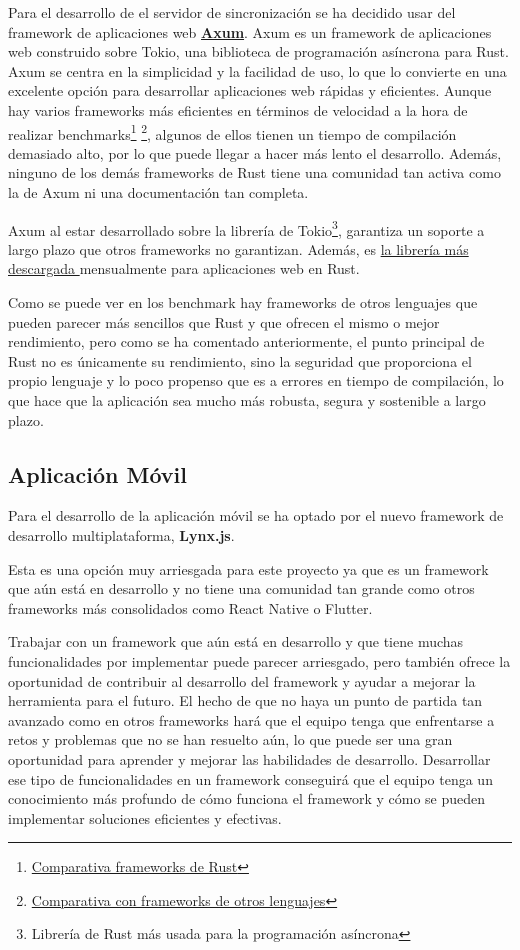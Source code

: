 Para el desarrollo de el servidor de sincronización se ha decidido usar del framework de aplicaciones web \href{https://github.com/tokio-rs/axum?tab=readme-ov-file}{\textbf{Axum}}.
Axum es un framework de aplicaciones web construido sobre Tokio, una biblioteca de programación asíncrona para Rust. Axum se centra en la simplicidad y la facilidad de uso, lo que lo convierte en una excelente opción para desarrollar aplicaciones web rápidas y eficientes.
Aunque hay varios frameworks más eficientes en términos de velocidad a la hora de realizar benchmarks\footnote{\href{https://web-frameworks-benchmark.netlify.app/result?l=rust}{Comparativa frameworks de Rust}} \footnote{\href{https://www.techempower.com/benchmarks/\#section=data-r21&test=composite&hw=ph}{Comparativa con frameworks de otros lenguajes}}, algunos de ellos tienen un tiempo de compilación demasiado alto, por lo que puede llegar a hacer más lento el desarrollo.
Además, ninguno de los demás frameworks de Rust tiene una comunidad tan activa como la de Axum ni una documentación tan completa.

Axum al estar desarrollado sobre la librería de Tokio\footnote{Librería de Rust más usada para la programación asíncrona}, garantiza un soporte a largo plazo que otros frameworks no garantizan. Además, es \href{https://lib.rs/crates/axum}{la librería más descargada }mensualmente para aplicaciones web en Rust.

Como se puede ver en los benchmark hay frameworks de otros lenguajes que pueden parecer más sencillos que Rust y que ofrecen el mismo o mejor rendimiento, pero como se ha comentado anteriormente, el punto principal de Rust no es únicamente su rendimiento, sino la seguridad que proporciona el propio lenguaje y lo poco propenso que es a errores en tiempo de compilación, lo que hace que la aplicación sea mucho más robusta, segura y sostenible a largo plazo.


\subsection{Aplicación Móvil}
Para el desarrollo de la aplicación móvil se ha optado por el nuevo framework de desarrollo multiplataforma, \textbf{Lynx.js}.

Esta es una opción muy arriesgada para este proyecto ya que es un framework que aún está en desarrollo y no tiene una comunidad tan grande como otros frameworks más consolidados como React Native o Flutter.

Trabajar con un framework que aún está en desarrollo y que tiene muchas funcionalidades por implementar puede parecer arriesgado, pero también ofrece la oportunidad de contribuir al desarrollo del framework y ayudar a mejorar la herramienta para el futuro.
El hecho de que no haya un punto de partida tan avanzado como en otros frameworks hará que el equipo tenga que enfrentarse a retos y problemas que no se han resuelto aún, lo que puede ser una gran oportunidad para aprender y mejorar las habilidades de desarrollo.
Desarrollar ese tipo de funcionalidades en un framework conseguirá que el equipo tenga un conocimiento más profundo de cómo funciona el framework y cómo se pueden implementar soluciones eficientes y efectivas.

